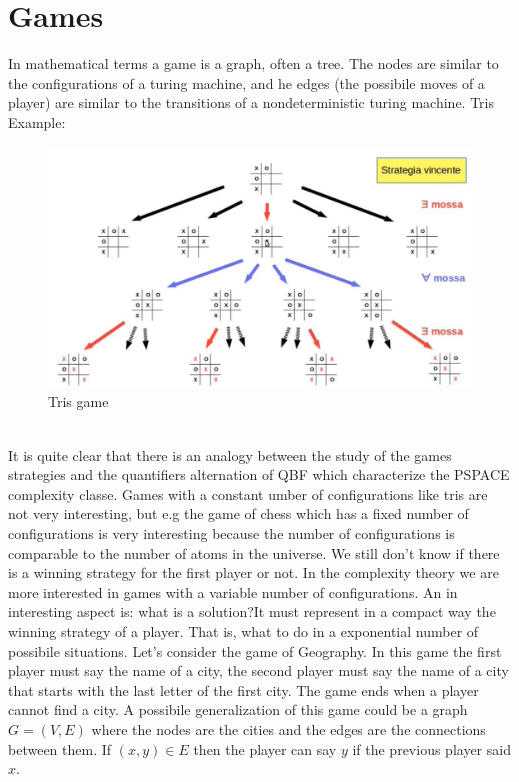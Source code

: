 \section{Games}
In mathematical terms a game is a graph, often a tree. The nodes are similar to the configurations of a turing machine, and he edges (the possibile moves of a player) are similar to the transitions of a nondeterministic turing machine. 
Tris Example:
\begin{figure}[h]
    \centering
    \includegraphics[width=1\textwidth]{img/tris.jpeg}
    \caption{Tris game}
\end{figure}
\\
It is quite clear that there is an analogy between the study of the games strategies and the quantifiers alternation of QBF which characterize the PSPACE complexity classe.
Games with a constant umber of configurations like tris are not very interesting, but e.g the game of chess which has a fixed number of configurations is very interesting because the number of configurations is comparable to the number of atoms in the universe. We still don't know if there is a winning strategy for the first player or not. In the complexity theory we are more interested in games with a variable number of configurations. An in interesting aspect is: what is a solution?It must represent in a compact way the winning strategy of a player. That is, what to do in a exponential number of possibile situations. Let's consider the game of Geography. In this game the first player must say the name of a city, the second player must say the name of a city that starts with the last letter of the first city. The game ends when a player cannot find a city. A possibile generalization of this game could be a graph $G=(V,E)$ where the nodes are the cities and the edges are the connections between them. If $(x,y)\in E$ then the player can say $y$ if the previous player said $x$.
